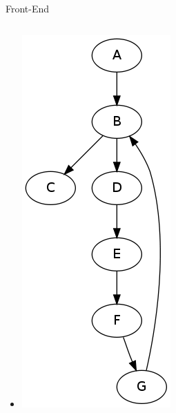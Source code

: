 \documentclass{beamer}
\begin{document}
\begin{frame}{Front-End}
\begin{columns}
\begin{column}{0.4\textwidth}
\begin{center}
\begin{itemize}
          \item<2->[] \includegraphics[scale=0.2]{controlflow.png}
        \end{itemize}
      \end{center}      
    \end{column}
  \end{columns}
\end{frame}
\end{document}
